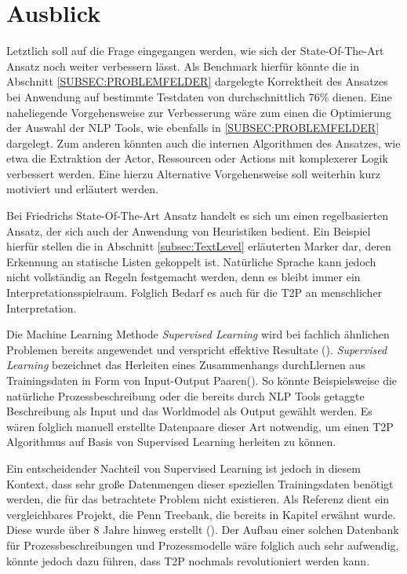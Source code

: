 \section{Ausblick}
Letztlich soll auf die Frage eingegangen werden, wie sich der State-Of-The-Art Ansatz noch weiter verbessern lässt. Als Benchmark hierfür könnte die in Abschnitt \ref{SUBSEC:PROBLEMFELDER} dargelegte Korrektheit des Ansatzes bei Anwendung auf bestimmte Testdaten von durchschnittlich 76\% dienen. Eine naheliegende Vorgehensweise zur Verbesserung wäre zum einen die Optimierung der Auswahl der \ac{NLP} Tools, wie ebenfalls in \ref{SUBSEC:PROBLEMFELDER} dargelegt. Zum anderen könnten auch die internen Algorithmen des Ansatzes, wie etwa die Extraktion der Actor, Ressourcen oder Actions mit komplexerer Logik verbessert werden. Eine hierzu Alternative Vorgehensweise soll weiterhin kurz motiviert und erläutert werden.\par  
Bei Friedrichs State-Of-The-Art Ansatz handelt es sich um einen regelbasierten Ansatz, der sich auch der Anwendung von Heuristiken bedient. Ein Beispiel hierfür stellen die in Abschnitt \ref{subsec:TextLevel} erläuterten Marker dar, deren Erkennung an statische Listen gekoppelt ist. Natürliche Sprache kann jedoch nicht vollständig an Regeln festgemacht werden, denn es bleibt immer ein Interpretationsspielraum. Folglich Bedarf es auch für die \ac{T2P} an menschlicher Interpretation. \par
Die Machine Learning Methode \textit{Supervised Learning} wird bei fachlich ähnlichen Problemen bereits angewendet und verspricht effektive Resultate (\cite[vgl.][2]{BPMML}). \textit{Supervised Learning} bezeichnet das Herleiten eines Zusammenhangs durchLlernen aus Trainingsdaten in Form von Input-Output Paaren(\cite[vgl.][695]{AIMODERN}). So könnte Beispielsweise die natürliche Prozessbeschreibung oder die bereits durch \ac{NLP} Tools getaggte Beschreibung als Input und das Worldmodel als Output gewählt werden. Es wären folglich manuell erstellte Datenpaare dieser Art notwendig, um einen \ac{T2P} Algorithmus auf Basis von Supervised Learning herleiten zu können.\par
Ein entscheidender Nachteil von Supervised Learning ist jedoch in diesem Kontext, dass sehr große Datenmengen dieser speziellen Trainingsdaten benötigt werden, die für das betrachtete Problem nicht existieren. Als Referenz dient ein vergleichbares Projekt, die Penn Treebank, die bereits in Kapitel \label{subsec:pos} erwähnt wurde. Diese wurde über 8 Jahre hinweg erstellt (\cite[vgl.][1]{PENNTREEBANK}). Der Aufbau einer solchen Datenbank für Prozessbeschreibungen und Prozessmodelle wäre folglich auch sehr aufwendig, könnte jedoch dazu führen, dass \ac{T2P} nochmals revolutioniert werden kann.